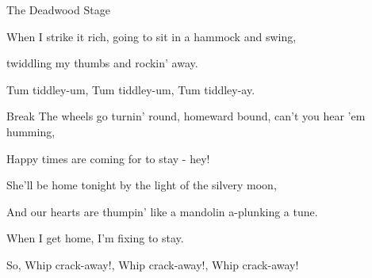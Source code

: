 \begin{SBSong}{The Deadwood Stage}
\begin{SBVerse}
    When I strike it rich, going to sit in a hammock and swing,
    
    twiddling my thumbs and rockin' away.
    
    Tum tiddley-um, Tum tiddley-um, Tum tiddley-ay.
  \end{SBVerse}
  \begin{SBBracket}{Break}
    The wheels go turnin' round, homeward bound, can't you hear 'em humming,
    
    Happy times are coming for to stay - hey!
  \end{SBBracket}
  \begin{SBVerse}
    She'll be home tonight by the light of the silvery moon,
    
    And our hearts are thumpin' like a mandolin a-plunking a tune.
    
    When I get home, I'm fixing to stay.
    
    So, Whip crack-away!, Whip crack-away!, Whip crack-away!
  \end{SBVerse}
\end{SBSong}
